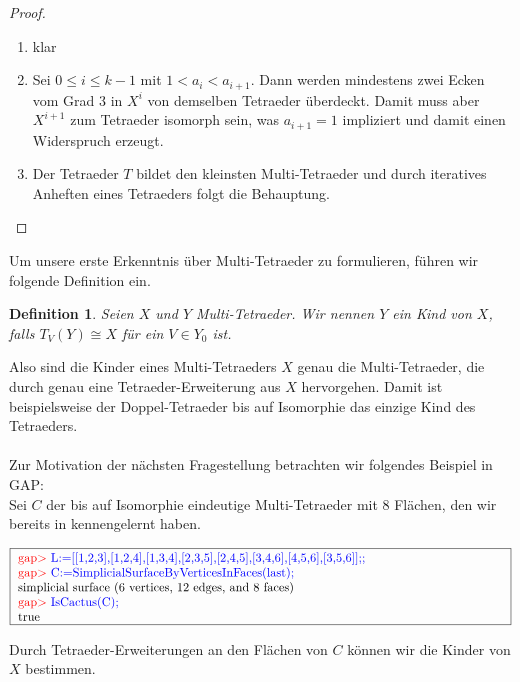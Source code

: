 \documentclass[12pt,titlepage,twoside,cleardoublepage]{article}
\theoremstyle{nummermitklammern}
\newtheorem{definition}[temp]{Definition}
\newtheorem{definition}[zahl]{Definition}
\numberwithin{equation}{section}
\begin{document}
\begin{proof}
\begin{enumerate}
\item klar
\item Sei $0\leq i \leq k-1$ mit $1<a_i <a_{i+1}.$ Dann werden mindestens zwei Ecken vom Grad 3 in $X^{i}$ von demselben Tetraeder überdeckt. Damit muss aber $X^{i+1}$ zum Tetraeder isomorph sein, was $a_{i+1}=1$ impliziert und damit einen Widerspruch erzeugt.
 \item Der Tetraeder $T$ bildet den kleinsten Multi-Tetraeder  und durch iteratives Anheften eines Tetraeders folgt die Behauptung.
\end{enumerate}
\end{proof}

Um unsere erste Erkenntnis über Multi-Tetraeder zu formulieren, führen wir folgende Definition ein.
\begin{definition}
Seien $X$ und $Y$ Multi-Tetraeder. Wir nennen $Y$ ein \emph{Kind} von $X$, falls $T_V(Y)\cong X$ für ein $V\in Y_0$ ist.
\end{definition}
Also sind die Kinder eines Multi-Tetraeders $X$ genau die Multi-Tetraeder, die durch genau eine Tetraeder-Erweiterung aus $X$ hervorgehen.
Damit ist beispielsweise der Doppel-Tetraeder bis auf Isomorphie das einzige Kind des Tetraeders. \\\\
Zur Motivation der nächsten Fragestellung betrachten wir folgendes Beispiel in GAP:\\
Sei $C$ der bis auf Isomorphie eindeutige Multi-Tetraeder mit 8 Flächen, den wir bereits in  kennengelernt haben. 
\begin{center}
$\fbox{
\parbox{14cm}{
\textcolor{red}{gap$>$} \textcolor{blue}{L:=[[1,2,3],[1,2,4],[1,3,4],[2,3,5],[2,4,5],[3,4,6],[4,5,6],[3,5,6]];;}\newline
\textcolor{red}{gap$>$} \textcolor{blue}{C:=SimplicialSurfaceByVerticesInFaces(last);}\newline
simplicial surface (6 vertices, 12 edges, and 8 faces)\newline
\textcolor{red}{gap$>$} \textcolor{blue}{IsCactus(C);}\newline
true
}}$
\end{center}
Durch Tetraeder-Erweiterungen an den Flächen von $C$ können wir die Kinder von $X$ bestimmen.
\end{document}
